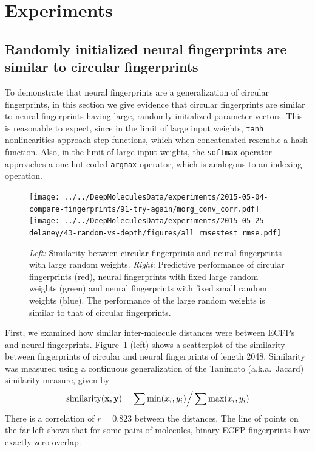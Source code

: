 \documentclass{article}
\newcommand{\vx}{\mathbf{x}}
\newcommand{\vy}{\mathbf{y}}
\begin{document}
\section{Experiments}
\label{sec:experiments}

\subsection{Randomly initialized neural fingerprints are similar to circular fingerprints}
\label{sec:random is equivalent}
To demonstrate that neural fingerprints are a generalization of circular fingerprints, in this section we give evidence that circular fingerprints are similar to neural fingerprints having large, randomly-initialized parameter vectors.
This is reasonable to expect, since in the limit of large input weights, \texttt{tanh} nonlinearities approach step functions, which when concatenated resemble a hash function.
Also, in the limit of large input weights, the \texttt{softmax} operator approaches a one-hot-coded \texttt{argmax} operator, which is analogous to an indexing operation.

\begin{figure}[h]
\centerline{\texttt{[image: ../../DeepMoleculesData/experiments/2015-05-04-compare-fingerprints/91-try-again/morg\_conv\_corr.pdf]}
\texttt{[image: ../../DeepMoleculesData/experiments/2015-05-25-delaney/43-random-vs-depth/figures/all\_rmsestest\_rmse.pdf]}}
\caption{\emph{Left:} Similarity between circular fingerprints and neural fingerprints with large random weights.
\emph{Right}: Predictive performance of circular fingerprints (red), neural fingerprints with fixed large random weights (green) and neural fingerprints with fixed small random weights (blue).
The performance of the large random weights is similar to that of circular fingerprints.}
\label{fig:fingerprint similarity}
\end{figure}

First, we examined how similar inter-molecule distances were between ECFPs and neural fingerprints.
Figure~\ref{fig:fingerprint similarity} (left) shows a scatterplot of the similarity between fingerprints of circular and neural fingerprints of length 2048.
Similarity was measured using a continuous generalization of the Tanimoto (a.k.a.\ Jacard) similarity measure, given by
\begin{equation}
\textnormal{similarity}(\vx, \vy) =  \sum \min(x_i, y_i) \Big/ \sum \max(x_i, y_i)
\end{equation}
There is a correlation of $r = 0.823$ between the distances.
The line of points on the far left shows that for some pairs of molecules, binary ECFP fingerprints have exactly zero overlap.
\end{document}

